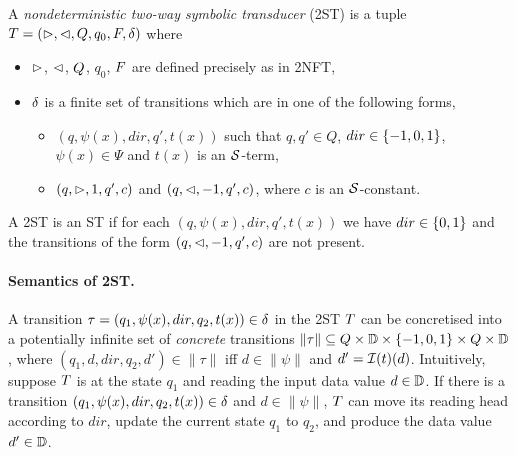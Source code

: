 \begin{definition}
    A \emph{nondeterministic two-way symbolic \emph{transducer}} (2ST) is a tuple $T = (\vartriangleright, \vartriangleleft, Q, q_0, F, \delta)$ where  
\begin{itemize}
%
\item $\vartriangleright$, $\vartriangleleft$, $Q$, $q_0$, $F$ are defined precisely as in 2NFT, 
%
\item $\delta$ is a finite set of  transitions which are in one of the following forms,
\begin{itemize}
\item   $(q, \psi(x), dir, q', t(x))$ such that $q, q' \in Q$, $dir \in \{-1, 0, 1\}$, $\psi(x) \in \Psi$ and
$t(x)$ is an $\mathcal{S}$-term, 
\item   $(q, \vartriangleright, 1, q', c)$ and $(q, \vartriangleleft, -1, q', c)$, where $c$ is an $\mathcal{S}$-constant. 
\end{itemize}
\end{itemize}
A 2ST is an ST if for each $(q, \psi(x), dir, q', t(x))$ we have $dir \in \{0, 1\}$ and the transitions of the form $(q, \vartriangleleft, -1, q', c)$ are not present.
\end{definition}

\paragraph{Semantics of 2ST.}
A transition $\tau=(q_1,\psi(x), dir, q_2, t(x)) \in \delta$ in the 2ST $T$ can be concretised
into a potentially infinite set of \emph{concrete} transitions $\|\tau\| \subseteq Q \times \mathbb{D} \times \{-1, 0, 1\} \times Q \times \mathbb{D}$, where $(q_1, d, dir, q_2, d')  \in \|\tau\|$ iff $d \in \|\psi\|$ and $d' = \mathcal{I}(t)(d)$.
Intuitively, suppose $T$ is at the state $q_1$ and reading the input data value $d \in \mathbb{D}$.
If there is a transition $(q_1, \psi(x), dir, q_2, t(x) )\in \delta$ and $d \in \|\psi\|$, $T$ can move its reading head according to $dir$, update the current state $q_1$ to $q_2$,  and produce the data value $d' \in \mathbb{D}$.

